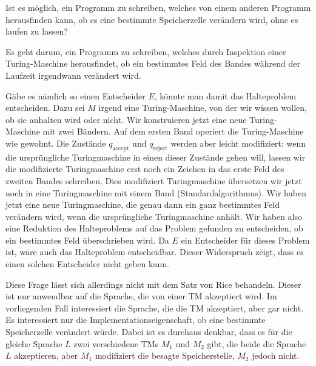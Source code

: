 Ist es möglich, ein Programm zu schreiben, welches von einem anderen
Programm herausfinden kann, ob es eine bestimmte Speicherzelle
verändern wird, ohne es laufen zu lassen?

\begin{loesung}
Es geht darum, ein Programm zu schreiben, welches durch Inspektion
einer Turing-Maschine herausfindet, ob ein bestimmtes Feld des
Bandes während der Laufzeit irgendwann verändert wird.

Gäbe es nämlich so einen Entscheider $E$, könnte man damit das Halteproblem
entscheiden. Dazu sei $M$ irgend eine Turing-Maschine, von der wir
wissen wollen, ob sie anhalten wird oder nicht.
Wir konstruieren jetzt eine neue Turing-Maschine mit zwei
Bändern. Auf dem ersten Band operiert die Turing-Maschine
wie gewohnt.
Die Zustände $q_\text{accept}$ und $q_\text{reject}$ werden
aber leicht modifiziert: wenn die ursprüngliche Turingmaschine 
in einen dieser Zustände gehen will, lassen wir die modifizierte
Turingmaschine erst noch ein Zeichen in das erste Feld des zweiten
Bandes schreiben. Dies modifiziert Turingmaschine übersetzen wir jetzt noch
in eine Turingmaschine mit einem Band (Standardalgorithmus). Wir haben
jetzt eine neue Turingmaschine, die genau dann ein ganz bestimmtes
Feld verändern wird, wenn die ursprüngliche Turingmaschine
anhält. Wir haben also eine Reduktion des Halteproblems auf das
Problem gefunden zu entscheiden, ob ein bestimmtes Feld überschrieben
wird. Da $E$ ein Entscheider für dieses Problem ist, wäre auch das
Halteproblem entscheidbar. Dieser Widerspruch zeigt, dass es einen
solchen Entscheider nicht geben kann.

Diese Frage lässt sich allerdings nicht mit dem Satz von Rice 
behandeln. Dieser ist nur anwendbar auf die Sprache, die von einer
TM akzeptiert wird. Im vorliegenden Fall interessiert die Sprache,
die die TM akzeptiert, aber gar nicht.
Es interessiert nur die Implementationseigenschaft, ob eine
bestimmte Speicherzelle verändert würde.
Dabei ist es durchaus denkbar, dass es für die gleiche Sprache $L$
zwei verschiedene TMs $M_1$ und $M_2$ gibt, die beide die Sprache $L$
akzeptieren, aber $M_1$ modifiziert die besagte Speicherstelle, $M_2$
jedoch nicht.
\end{loesung}

